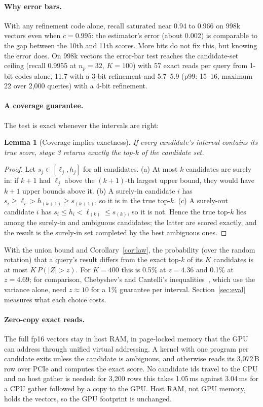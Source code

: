 \documentclass[fleqn,10pt]{wlscirep}
\newtheorem{lemma}{Lemma}
\begin{document}
\paragraph{Why error bars.} With any refinement code alone, recall saturated near 0.94 to 0.966 on 998k vectors even when $c=0.995$: the estimator's error (about 0.002) is comparable to the gap between the 10th and 11th scores. More bits do not fix this, but knowing the error does. On 998k vectors the error-bar test reaches the candidate-set ceiling (recall 0.9955 at $n_p=32$, $K=100$) with 57 exact reads per query from 1-bit codes alone, 11.7 with a 3-bit refinement and 5.7--5.9 (p99: 15--16, maximum 22 over 2{,}000 queries) with a 4-bit refinement.

\paragraph{A coverage guarantee.} The test is exact whenever the intervals are right:
\begin{lemma}[Coverage implies exactness]\label{lem:cov}
If every candidate's interval contains its true score, stage 3 returns exactly the top-$k$ of the candidate set.
\end{lemma}
\begin{proof}
Let $s_j\in[\ell_j,h_j]$ for all candidates. (a) At most $k$ candidates are surely in: if $k{+}1$ had $\ell_j$ above the $(k{+}1)$-th largest upper bound, they would have $k{+}1$ upper bounds above it. (b) A surely-in candidate $i$ has $s_i\ge\ell_i>h_{(k+1)}\ge s_{(k+1)}$, so it is in the true top-$k$. (c) A surely-out candidate $i$ has $s_i\le h_i<\ell_{(k)}\le s_{(k)}$, so it is not. Hence the true top-$k$ lies among the surely-in and ambiguous candidates; the latter are scored exactly, and the result is the surely-in set completed by the best ambiguous ones.
\end{proof}
With the union bound and Corollary~\ref{cor:law}, the probability (over the random rotation) that a query's result differs from the exact top-$k$ of its $K$ candidates is at most $K\,P(|Z|>z)$. For $K=400$ this is 0.5\% at $z=4.36$ and 0.1\% at $z=4.69$; for comparison, Chebyshev's and Cantelli's inequalities~\cite{cantelli1928}, which use the variance alone, need $z\approx10$ for a 1\% guarantee per interval. Section~\ref{sec:eval} measures what each choice costs.

\paragraph{Zero-copy exact reads.} The full fp16 vectors stay in host RAM, in page-locked memory that the GPU can address through unified virtual addressing. A kernel with one program per candidate exits unless the candidate is ambiguous, and otherwise reads its 3{,}072\,B row over PCIe and computes the exact score. No candidate ids travel to the CPU and no host gather is needed: for 3{,}200 rows this takes 1.05\,ms against 3.04\,ms for a CPU gather followed by a copy to the GPU. Host RAM, not GPU memory, holds the vectors, so the GPU footprint is unchanged.
\end{document}
